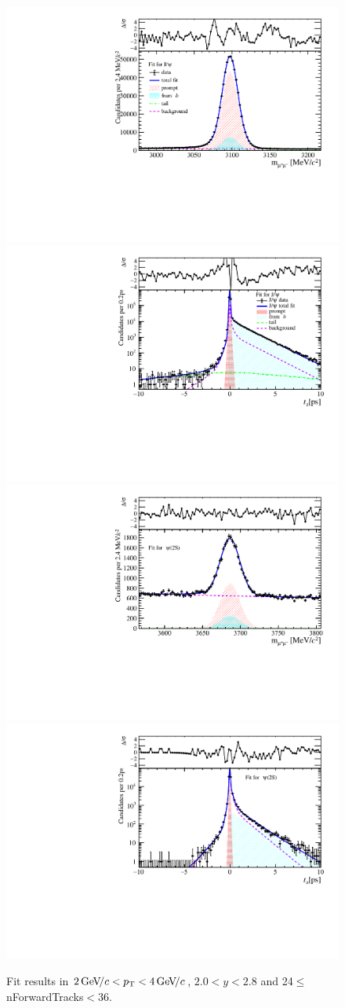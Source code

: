 \begin{figure}[H]
\begin{center}
\includegraphics[width=0.47\linewidth]{pdf/Jpsi/drawmassF/n3y1pt2.pdf}
\includegraphics[width=0.47\linewidth]{pdf/Jpsi/2DFitF/n3y1pt2.pdf}
\vspace*{-0.5cm}
\includegraphics[width=0.47\linewidth]{pdf/Psi2S/drawmassF/n3y1pt2.pdf}
\includegraphics[width=0.47\linewidth]{pdf/Psi2S/2DFitF/n3y1pt2.pdf}
\vspace*{-0.5cm}
\end{center}
\caption{Fit results in $2\text{\,Ge\kern -0.1em V\!/}c<p_{\mathrm{T}}<4\text{\,Ge\kern -0.1em V\!/}c$, $2.0<y<2.8$ and 24$\leq$nForwardTracks$<$36.}
\label{Fitn3y1pt2}
\end{figure}
